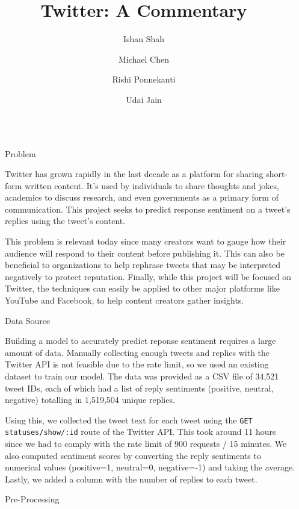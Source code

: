 \documentclass[final]{beamer}
\title{Twitter: A Commentary}
\author{Ishan Shah \and Michael Chen \and Rishi Ponnekanti \and Udai Jain}
\institute[shortinst]{The University of Texas at Austin}
\def\code#1{\texttt{#1}}
\newlength{\sepwidth}
\newlength{\colwidth}
\newcommand{\separatorcolumn}{\begin{column}{\sepwidth}\end{column}}
\begin{document}
\begin{frame}[t]
\begin{columns}[t]
\separatorcolumn

\begin{column}{\colwidth}

  \begin{block}{Problem}

    Twitter has grown rapidly in the last decade as a platform for sharing short-form written content. It’s used by individuals to share thoughts and jokes, academics to discuss research, and even governments as a primary form of communication. This project seeks to predict response sentiment on a tweet’s replies using the tweet’s content.

    This problem is relevant today since many creators want to gauge how their audience will respond to their content before publishing it. This can also be beneficial to organizations to help rephrase tweets that may be interpreted negatively to protect reputation. Finally, while this project will be focused on Twitter, the techniques can easily be applied to other major platforms like YouTube and Facebook, to help content creators gather insights.

  \end{block}

  \begin{block}{Data Source}

    Building a model to accurately predict reponse sentiment requires a large amount of data. Manually collecting enough tweets and replies with the Twitter API is not feasible due to the rate limit, so we used an existing dataset \cite{RETWEET} to train our model. The data was provided as a CSV file of 34,521 tweet IDs, each of which had a list of reply sentiments (positive, neutral, negative) totalling in 1,519,504 unique replies.
    
    Using this, we collected the tweet text for each tweet using the \code{GET statuses/show/:id} route of the Twitter API. This took around 11 hours since we had to comply with the rate limit of 900 requests / 15 minutes. We also computed sentiment scores by converting the reply sentiments to numerical values (positive=1, neutral=0, negative=-1) and taking the average. Lastly, we added a column with the number of replies to each tweet.

  \end{block}

  \begin{block}{Pre-Processing}


\end{block}
\end{column}
\end{columns}
\end{frame}
\end{document}
